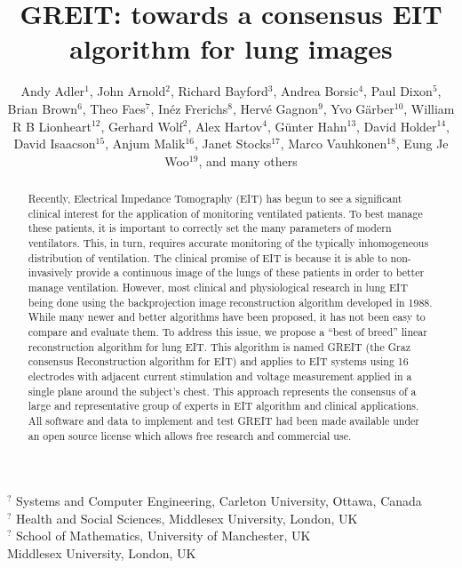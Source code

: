 \documentclass[letterpaper,twocolumn,11pt]{article}
\begin{document}
\title{GREIT: towards a consensus EIT algorithm for lung images}

\author{Andy Adler$^1$,
        John Arnold$^2$,
        Richard Bayford$^3$,
        Andrea Borsic$^4$,
        Paul Dixon$^5$,
        Brian Brown$^6$,
        Theo Faes$^7$,
        In\'ez Frerichs$^8$,
        Herv\'e Gagnon$^9$,
        Yvo G\"arber$^10$,
        William R B Lionheart$^12$,
        Gerhard Wolf$^2$,
        Alex Hartov$^4$,
        G\"unter Hahn$^13$,
        David Holder$^14$,
        David Isaacson$^15$,
        Anjum Malik$^16$,
        Janet Stocks$^17$,
        Marco Vauhkonen$^18$,
        Eung Je Woo$^19$,
        and many others%
       }

\maketitle

{\small
\noindent $^?$ Systems and Computer Engineering,
               Carleton University, Ottawa, Canada \\
\noindent $^?$ Health and Social Sciences,
               Middlesex University, London, UK \\
\noindent $^?$ School of Mathematics,
               University of Manchester, UK \\
               Middlesex University, London, UK \\
}



\begin{abstract}
Recently, Electrical Impedance Tomography (EIT) has begun to see a
significant clinical interest for the application of monitoring
ventilated patients. To best manage these patients, it is important
to correctly set the many parameters of modern ventilators. This,
in turn, requires accurate monitoring of the
typically inhomogeneous distribution of ventilation.
The clinical promise of EIT is because it is able to non-invasively
provide a continuous image of the lungs of these patients in order
to better manage ventilation.
However, most clinical and physiological research in lung EIT
being done using the backprojection image reconstruction algorithm
developed in 1988.  While many newer and better algorithms have been
proposed, it has not been easy to compare and evaluate them.
To address this issue, we propose a ``best of breed'' linear
reconstruction algorithm for lung EIT. This algorithm is named
GREIT (the Graz consensus Reconstruction algorithm for EIT) and
applies to EIT systems using 16 electrodes with adjacent
current stimulation and voltage measurement applied in a single
plane around the subject's chest.
This approach represents the consensus of a large and representative
group of experts in EIT algorithm and clinical applications.
All software and data to implement and test GREIT had been
made available under an open source license which allows free
research and commercial use.
\end{abstract}
\end{document}
